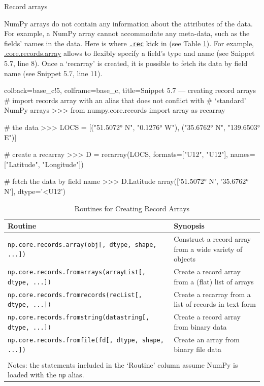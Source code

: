 \documentclass[a4paper,11pt]{book}
\newcommand{\question}[1]{%
    \begin{tcolorbox}[colback=comp_c!10,colframe=comp_c,sidebyside align=top,width=\linewidth,before skip=1ex]
        #1
    \end{tcolorbox}
    \switchcolumn%
}
\newcommand{\note}[1]{%
    \begin{tcolorbox}[colback=white!0,colframe=white!10,width=\linewidth,before skip=1ex]
        #1
    \end{tcolorbox}
}
\begin{document}
\begin{paracol}{2}
	\question{\raggedright Record arrays}
	\note{NumPy arrays do not contain any information about the attributes of the data. For example, a NumPy array cannot accommodate any meta-data, such as the fields' names in the data. Here is where \href{https://numpy.org/doc/stable/reference/routines.array-creation.html}{\texttt{.rec}} kick in (see Table \ref{tab:array_for_record_arrays}). For example, \href{https://numpy.org/doc/stable/reference/generated/numpy.core.records.array.html\#numpy.core.records.array}{.core.records.array} allows to flexibly specify a field's type and name (see Snippet 5.7, line 8). Once a `recarray' is created, it is possible to fetch its data by field name (see Snippet 5.7, line 11).}
\end{paracol}

\begin{pythoncode}[linenos=true,]{colback=base_c!5, colframe=base_c, title=\sffamily Snippet 5.7 --- creating record arrays}
# import records array with an alias that does not conflict with
# `standard' NumPy arrays
>>> from numpy.core.records import array as recarray

# the data
>>> LOCS = [("51.5072° N", "0.1276° W"), ("35.6762° N", "139.6503° E")]

# create a recarray
>>> D = recarray(LOCS, formats=["U12", "U12"], names=["Latitude", "Longitude"])

# fetch the data by field name
>>> D.Latitude
array(['51.5072° N', '35.6762° N'], dtype='<U12')
\end{pythoncode}

\begin{table}
	\centering
	\caption{Routines for Creating Record Arrays}
	\label{tab:array_for_record_arrays}
	\begin{tabular}{lp{12cm}}
		\toprule \toprule
			Routine & Synopsis \\
			\midrule
			\texttt{np.core.records.array(obj[, dtype, shape, ...])} &
			Construct a record array from a wide variety of objects\\
			\texttt{np.core.records.fromarrays(arrayList[, dtype, ...])} &
			Create a record array from a (flat) list of arrays\\
			\texttt{np.core.records.fromrecords(recList[, dtype, ...])} &
			Create a recarray from a list of records in text form\\
			\texttt{np.core.records.fromstring(datastring[, dtype, ...])} &
			Create a record array from binary data\\
			\texttt{np.core.records.fromfile(fd[, dtype, shape, ...])} &
			Create an array from binary file data\\
			\bottomrule \\[-1.8ex]
		    \multicolumn{2}{l}{Notes: the statements included in the `Routine' column assume NumPy is loaded with the \texttt{np} alias.} \\
	\end{tabular}
\end{table}
\clearpage
\end{document}
